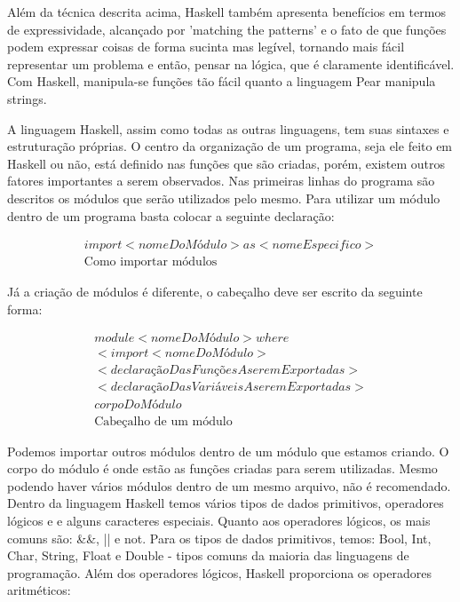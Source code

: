 \documentclass[
  12pt,				         %
  oneside,			       %
  a4paper,			       %
  english,		       	 %
  brazil,			      	 %
]{abntex2}
\begin{document}
    Além da técnica descrita acima, Haskell também apresenta benefícios em termos de expressividade, alcançado por 'matching the patterns' e o fato de que funções podem
    expressar coisas de forma sucinta mas legível, tornando mais fácil representar um problema e então, pensar na lógica, que é claramente identificável. Com Haskell,
    manipula-se funções tão fácil quanto a linguagem Pear manipula strings.

    A linguagem Haskell, assim como todas as outras linguagens, tem suas sintaxes e estruturação próprias. O centro da organização de um programa, seja ele feito em Haskell ou não,
    está definido nas funções que são criadas, porém, existem outros fatores importantes a serem observados.
    Nas primeiras linhas do programa são descritos os módulos que serão utilizados pelo mesmo. Para utilizar um módulo dentro de um programa basta colocar a seguinte declaração:

    \begin{gather*}
      import<nomeDoMódulo> as <nomeEspecifico> \\
      \text{Como importar módulos}
    \end{gather*}

    Já a criação de módulos é diferente, o cabeçalho deve ser escrito da seguinte forma:

    \begin{gather*}
      module<nomeDoMódulo>where \\
      <import<nomeDoMódulo> \\
      <declaraçãoDasFunçõesAseremExportadas> \\
      <declaraçãoDasVariáveisAseremExportadas> \\
      corpoDoMódulo \\
      \text{Cabeçalho de um módulo}
    \end{gather*}

    \newpage 

    Podemos importar outros módulos dentro de um módulo que estamos criando. O corpo do módulo é onde estão as funções criadas para serem utilizadas. Mesmo podendo haver vários módulos
    dentro de um mesmo arquivo, não é recomendado.
    Dentro da linguagem Haskell temos vários tipos de dados primitivos, operadores lógicos e e alguns caracteres especiais. Quanto aos operadores lógicos, os mais comuns são:
    \&\&, || e not. Para os tipos de dados primitivos, temos: Bool, Int, Char, String, Float e Double - tipos comuns da maioria das linguagens de programação. 
    Além dos operadores lógicos, Haskell proporciona os operadores aritméticos:
\end{document}
